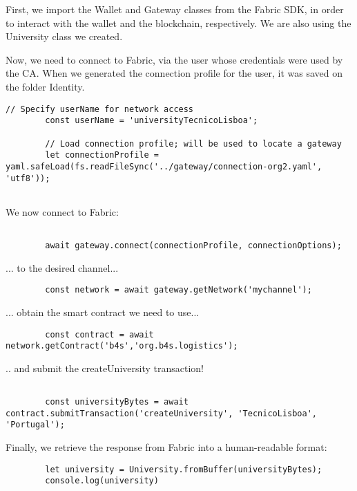 \documentclass[12pt,a4paper]{article}
\theoremstyle{definition}
\begin{document}
First, we import the Wallet and Gateway classes from the Fabric SDK, in order to interact with the wallet and the blockchain, respectively. We are also using the University class we created. 

Now, we need to connect to Fabric, via the user whose credentials were used by the CA. When we generated the connection profile for the user, it was saved on the folder Identity.

\begin{verbatim}
// Specify userName for network access
        const userName = 'universityTecnicoLisboa';

        // Load connection profile; will be used to locate a gateway
        let connectionProfile = yaml.safeLoad(fs.readFileSync('../gateway/connection-org2.yaml', 'utf8'));


\end{verbatim}

We now connect to Fabric:
\begin{verbatim}

        await gateway.connect(connectionProfile, connectionOptions);

\end{verbatim}


... to the desired channel...
\begin{verbatim}
        const network = await gateway.getNetwork('mychannel');
\end{verbatim}


... obtain the smart contract we need to use...
\begin{verbatim}
        const contract = await network.getContract('b4s','org.b4s.logistics');

\end{verbatim}

.. and submit the createUniversity transaction!
\begin{verbatim}

        const universityBytes = await contract.submitTransaction('createUniversity', 'TecnicoLisboa', 'Portugal');

\end{verbatim}



Finally, we retrieve the response from Fabric into a human-readable format:

\begin{verbatim}
        let university = University.fromBuffer(universityBytes);
        console.log(university)


\end{verbatim}
\end{document}
